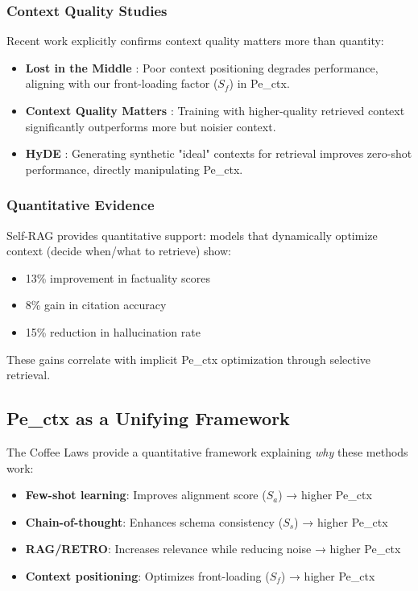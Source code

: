 \documentclass[conference]{IEEEtran}
\begin{document}
\subsubsection{Context Quality Studies}

Recent work explicitly confirms context quality matters more than quantity:

\begin{itemize}
\item \textbf{Lost in the Middle} \cite{liu2023lost}: Poor context positioning degrades performance, aligning with our front-loading factor ($S_f$) in Pe\_ctx.
\item \textbf{Context Quality Matters} \cite{contextquality2024}: Training with higher-quality retrieved context significantly outperforms more but noisier context.
\item \textbf{HyDE} \cite{gao2023hyde}: Generating synthetic "ideal" contexts for retrieval improves zero-shot performance, directly manipulating Pe\_ctx.
\end{itemize}

\subsubsection{Quantitative Evidence}

Self-RAG \cite{asai2023selfrag} provides quantitative support: models that dynamically optimize context (decide when/what to retrieve) show:
\begin{itemize}
\item 13\% improvement in factuality scores
\item 8\% gain in citation accuracy
\item 15\% reduction in hallucination rate
\end{itemize}

These gains correlate with implicit Pe\_ctx optimization through selective retrieval.

\subsection{Pe\_ctx as a Unifying Framework}

The Coffee Laws provide a quantitative framework explaining \textit{why} these methods work:

\begin{itemize}
\item \textbf{Few-shot learning}: Improves alignment score ($S_a$) → higher Pe\_ctx
\item \textbf{Chain-of-thought}: Enhances schema consistency ($S_s$) → higher Pe\_ctx
\item \textbf{RAG/RETRO}: Increases relevance while reducing noise → higher Pe\_ctx
\item \textbf{Context positioning}: Optimizes front-loading ($S_f$) → higher Pe\_ctx
\end{itemize}
\end{document}
